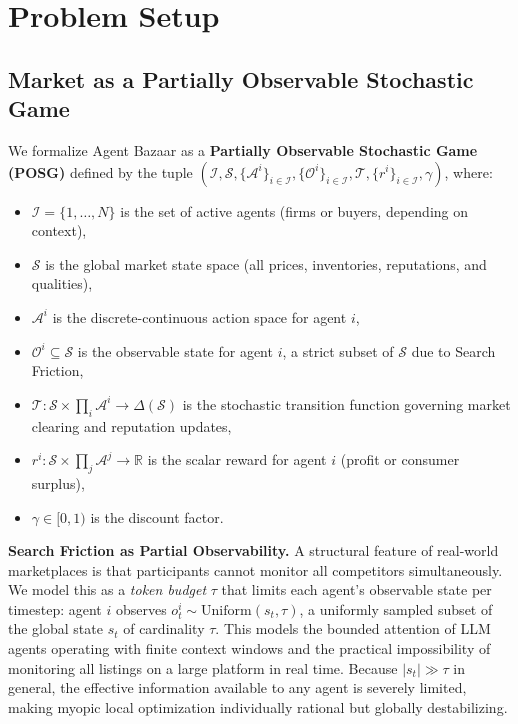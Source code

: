 \section{Problem Setup}
\label{setup}

\subsection{Market as a Partially Observable Stochastic Game}

We formalize Agent Bazaar as a \textbf{Partially Observable Stochastic Game (POSG)} \citep{hansen2004dynamic} defined by the tuple $(\mathcal{I}, \mathcal{S}, \{\mathcal{A}^i\}_{i \in \mathcal{I}}, \{\mathcal{O}^i\}_{i \in \mathcal{I}}, \mathcal{T}, \{r^i\}_{i \in \mathcal{I}}, \gamma)$, where:
\begin{itemize}
    \item $\mathcal{I} = \{1, \ldots, N\}$ is the set of active agents (firms or buyers, depending on context),
    \item $\mathcal{S}$ is the global market state space (all prices, inventories, reputations, and qualities),
    \item $\mathcal{A}^i$ is the discrete-continuous action space for agent $i$,
    \item $\mathcal{O}^i \subseteq \mathcal{S}$ is the observable state for agent $i$, a strict subset of $\mathcal{S}$ due to Search Friction,
    \item $\mathcal{T}: \mathcal{S} \times \prod_i \mathcal{A}^i \to \Delta(\mathcal{S})$ is the stochastic transition function governing market clearing and reputation updates,
    \item $r^i: \mathcal{S} \times \prod_j \mathcal{A}^j \to \mathbb{R}$ is the scalar reward for agent $i$ (profit or consumer surplus),
    \item $\gamma \in [0,1)$ is the discount factor.
\end{itemize}

\textbf{Search Friction as Partial Observability.}
A structural feature of real-world marketplaces is that participants cannot monitor all competitors simultaneously. We model this as a \textit{token budget} $\tau$ that limits each agent's observable state per timestep: agent $i$ observes $o_t^i \sim \mathrm{Uniform}(s_t, \tau)$, a uniformly sampled subset of the global state $s_t$ of cardinality $\tau$. This models the bounded attention of LLM agents operating with finite context windows and the practical impossibility of monitoring all listings on a large platform in real time. Because $|s_t| \gg \tau$ in general, the effective information available to any agent is severely limited, making myopic local optimization individually rational but globally destabilizing.


